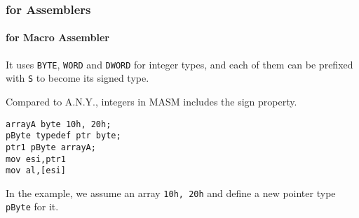 \subsubsection{for Assemblers}

\paragraph{for Macro Assembler}
It uses \verb`BYTE`, \verb`WORD` and \verb`DWORD` for integer types, and each of them can be prefixed with \verb`S` to become its signed type.

Compared to A.N.Y., integers in MASM includes the sign property.

\lstset{style=GlobalASMx86}
\begin{lstlisting}[language={[x86masm]Assembler}]
arrayA byte 10h, 20h;
pByte typedef ptr byte;
ptr1 pByte arrayA;
mov esi,ptr1
mov al,[esi]
\end{lstlisting}

In the example, we assume an array \verb|10h, 20h| and define a new pointer type \verb|pByte| for it. 

